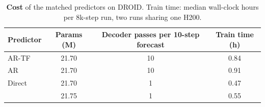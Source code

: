 \begin{table}[t]
\centering
\caption{\textbf{Cost} of the matched predictors on DROID. Train time: median wall-clock hours per 8k-step run, two runs sharing one H200.}
\label{tab:efficiency}
\scriptsize
\begin{tabular}{@{}lccc@{}}
\toprule
Predictor & Params (M) & Decoder passes per 10-step forecast & Train time (h) \\
\midrule
AR-TF       & 21.70 & 10 & 0.84 \\
AR          & 21.70 & 10 & 0.91 \\
Direct      & 21.70 & 1 & 0.47 \\
\ours{}     & 21.75 & 1 & 0.55 \\
\bottomrule
\end{tabular}
\end{table}
